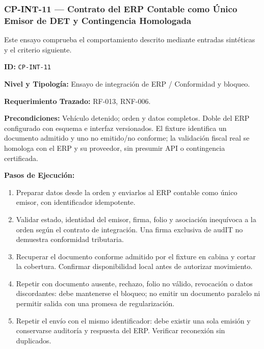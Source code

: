 \subsubsection*{CP-INT-11 — Contrato del ERP Contable como Único Emisor de DET y Contingencia Homologada}\label{sec:9-cp-int-11}
Este ensayo comprueba el comportamiento descrito mediante entradas sintéticas y el criterio siguiente.

\par\noindent\textbf{ID:} \texttt{C\allowbreak{}P\allowbreak{}-\allowbreak{}I\allowbreak{}N\allowbreak{}T\allowbreak{}-\allowbreak{}1\allowbreak{}1\allowbreak{}}\par
\par\noindent\textbf{Nivel y Tipología:} Ensayo de integración de ERP / Conformidad y bloqueo.\par
\par\noindent\textbf{Requerimiento Trazado:} RF-013, RNF-006.\par
\par\noindent\textbf{Precondiciones:} Vehículo detenido; orden y datos completos. Doble del ERP configurado con esquema e interfaz versionados. El fixture identifica un documento admitido y uno no emitido/no conforme; la validación fiscal real se homologa con el ERP y su proveedor, sin presumir API o contingencia certificada.\par
\par\noindent\textbf{Pasos de Ejecución:} \par
\begin{enumerate}
\item Preparar datos desde la orden y enviarlos al ERP contable como único emisor, con identificador idempotente.
\item Validar estado, identidad del emisor, firma, folio y asociación inequívoca a la orden según el contrato de integración. Una firma exclusiva de audIT no demuestra conformidad tributaria.
\item Recuperar el documento conforme admitido por el fixture en cabina y cortar la cobertura. Confirmar disponibilidad local antes de autorizar movimiento.
\item Repetir con documento ausente, rechazo, folio no válido, revocación o datos discordantes: debe mantenerse el bloqueo; no emitir un documento paralelo ni permitir salida con una promesa de regularización.
\item Repetir el envío con el mismo identificador: debe existir una sola emisión y conservarse auditoría y respuesta del ERP. Verificar reconexión sin duplicados.
\end{enumerate}
